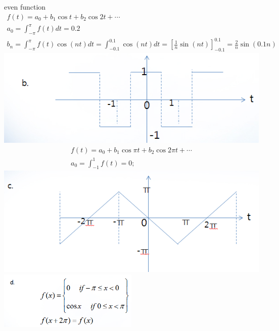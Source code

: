 \documentclass[12pt,a4paper]{article}
\begin{document}
even function 
\begin{gather*}
f(t) = a_0 + b_1 \cos t + b_2 \cos 2t + \cdots\\
a_0 = \int_{-\pi}^\pi f(t) dt = 0.2\\
b_n = \int_{-\pi}^\pi f(t)\cos(nt) dt
=\int_{-0.1}^{0.1}\cos(nt)dt
=\left[\frac{1}{n}\sin(nt)\right]_{-0.1}^{0.1}
=\frac{2}{n}\sin(0.1n) 
\end{gather*}
\includegraphics[width=\textwidth]{2.png}
\begin{gather*}
f(t) = a_0 + b_1 \cos \pi t + b_2 \cos 2\pi t+ \cdots\\
a_0 = \int_{-1}^1 f(t) = 0;
\end{gather*}
\includegraphics[width=\textwidth]{3.png}
\includegraphics[width=0.5\textwidth]{4.png}
\end{document}

